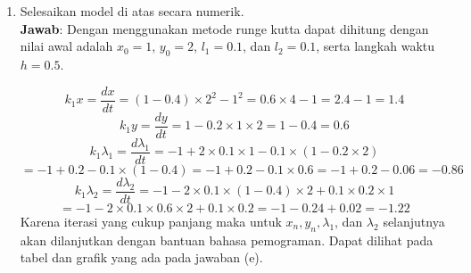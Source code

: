 \documentclass{article}
\begin{document}
\begin{enumerate}[label=\alph*.]
    \item Selesaikan model di atas secara numerik.\\
    \textbf{Jawab}: Dengan menggunakan metode runge kutta dapat dihitung dengan nilai awal adalah \(x_0 = 1\), \(y_0 = 2\), \(l_1 = 0.1\), dan \(l_2 = 0.1\), serta langkah waktu \(h = 0.5\).

\[
k_1x = \frac{dx}{dt} = (1 - 0.4) \times 2^2 - 1^2 = 0.6 \times 4 - 1 = 2.4 - 1 = 1.4
\]
\[
k_1y = \frac{dy}{dt} = 1 - 0.2 \times 1 \times 2 = 1 - 0.4 = 0.6
\]
\[
k_1\lambda_1 = \frac{d\lambda_1}{dt} = -1 + 2 \times 0.1 \times 1 - 0.1 \times (1 - 0.2 \times 2)
\]
\[
= -1 + 0.2 - 0.1 \times (1 - 0.4) = -1 + 0.2 - 0.1 \times 0.6 = -1 + 0.2 - 0.06 = -0.86
\]
\[
k_1\lambda_2 = \frac{d\lambda_2}{dt} = -1 - 2 \times 0.1 \times (1 - 0.4) \times 2 + 0.1 \times 0.2 \times 1
\]
\[
= -1 - 2 \times 0.1 \times 0.6 \times 2 + 0.1 \times 0.2 = -1 - 0.24 + 0.02 = -1.22
\]
Karena iterasi yang cukup panjang maka untuk $x_n,y_n,\lambda_1$, dan $\lambda_2$ selanjutnya akan dilanjutkan dengan bantuan bahasa pemograman. Dapat dilihat pada tabel dan grafik yang ada pada jawaban (e).
\newpage
 

\end{enumerate}
\end{document}
